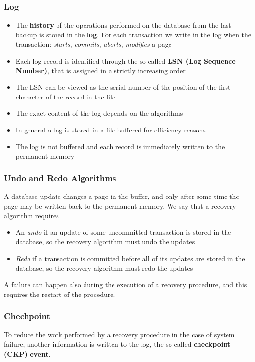 \subsubsection{Log}
\begin{itemize}
    \item The \textbf{history} of the operations performed on the database from the last backup is stored in the \textbf{log}. For each transaction we write in the log when the transaction: \textit{starts}, \textit{commits}, \textit{aborts}, \textit{modifies} a page
    \item Each log record is identified through the so called \textbf{LSN (Log Sequence Number)}, that is assigned in a strictly increasing order
    \item The LSN can be viewed as the serial number of the position of the first character of the record in the file.
    \item The exact content of the log depends on the algorithms
    \item In general a log is stored in a file buffered for efficiency reasons
    \item The log is not buffered and each record is immediately written to the permanent memory
\end{itemize}

\subsubsection{Undo and Redo Algorithms}
A database update changes a page in the buffer, and only after some time the page may be written back to the permanent memory. We say that a recovery algorithm requires
\begin{itemize}
    \item An \textit{undo} if an update of some uncommitted transaction is stored in the database, so the  recovery algorithm must undo the updates
    \item \textit{Redo} if a transaction is committed before all of its updates are stored in the database, so the recovery algorithm must redo the updates
\end{itemize}
A failure can happen also during the execution of a recovery procedure, and this requires the restart of the procedure.

\subsubsection{Chechpoint}
To reduce the work performed by a recovery procedure in the case of system failure, another information is written to the log, the so called \textbf{checkpoint (CKP) event}.

